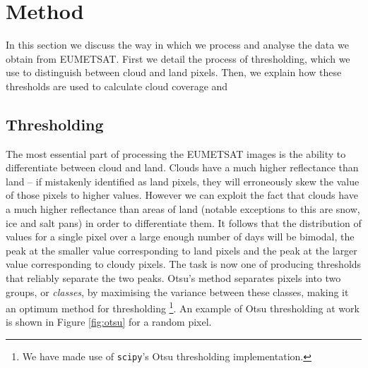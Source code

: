 \section{Method}

In this section we discuss the way in which we process and analyse the data we obtain from EUMETSAT. First we detail the process of thresholding, which we use to distinguish between cloud and land pixels. Then, we explain how these thresholds are used to calculate cloud coverage and

\subsection{Thresholding}
The most essential part of processing the EUMETSAT images is the ability to
differentiate between cloud and land. Clouds have a much higher reflectance than
land -- if mistakenly identified as land pixels, they will erroneously skew the
value of those pixels to higher values. However we can exploit the fact that
clouds have a much higher reflectance than areas of land (notable
  exceptions to this are snow, ice and salt pans) in order to differentiate
them. It follows that the distribution of values for a single pixel over a large
enough number of days will be bimodal, the peak at the smaller value
corresponding to land pixels and the peak at the larger value corresponding to
cloudy pixels. The task is now one of producing thresholds that reliably
separate the two peaks. Otsu's method \citep{gonzalez2008} separates pixels into
two groups, or \emph{classes}, by maximising the variance between these classes,
making it an optimum method for thresholding \footnote{We have made use of
  \texttt{scipy}'s Otsu thresholding implementation.}. An example of Otsu
thresholding at work is shown in Figure \ref{fig:otsu} for a random pixel.
